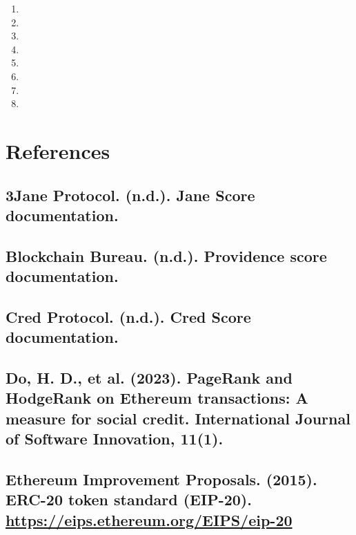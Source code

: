 \documentclass[
]{article}
\begin{document}
\begin{enumerate}
\def\labelenumi{\arabic{enumi}.}
\setcounter{enumi}{1}
\item
\item
\item
\item
\item
\item
\item
\item
\end{enumerate}

\section{References}\label{references}

\subsection{3Jane Protocol. (n.d.). Jane Score documentation.}\label{jane-protocol.-n.d..-jane-score-documentation.}

\subsection{Blockchain Bureau. (n.d.). Providence score documentation.}\label{blockchain-bureau.-n.d..-providence-score-documentation.}

\subsection{Cred Protocol. (n.d.). Cred Score documentation.}\label{cred-protocol.-n.d..-cred-score-documentation.}

\subsection{Do, H. D., et al. (2023). PageRank and HodgeRank on Ethereum transactions: A measure for social credit. International Journal of Software Innovation, 11(1).}\label{do-h.-d.-et-al.-2023.-pagerank-and-hodgerank-on-ethereum-transactions-a-measure-for-social-credit.-international-journal-of-software-innovation-111.}

\subsection{\texorpdfstring{Ethereum Improvement Proposals. (2015). ERC-20 token standard (EIP-20). \url{https://eips.ethereum.org/EIPS/eip-20}}{Ethereum Improvement Proposals. (2015). ERC-20 token standard (EIP-20). https://eips.ethereum.org/EIPS/eip-20}}\label{ethereum-improvement-proposals.-2015.-erc-20-token-standard-eip-20.-httpseips.ethereum.orgeipseip-20}
\end{document}

